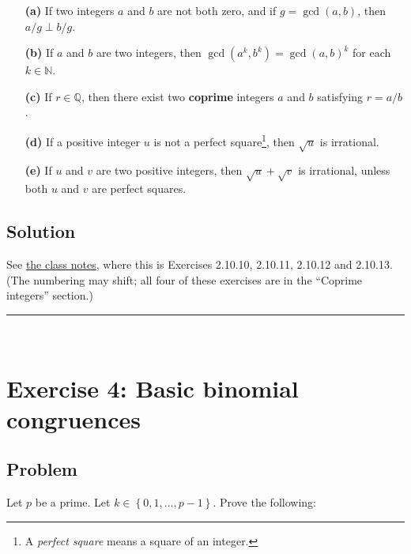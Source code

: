 \documentclass[paper=a4, fontsize=12pt]{scrartcl} %
\newcommand{\QQ}{\mathbb{Q}} %
\newcommand{\NN}{\mathbb{N}} %
\newcommand{\set}[1]{\left\{ #1 \right\}}
\newcommand{\tup}[1]{\left( #1 \right)}
\newcommand{\horrule}[1]{\rule{\linewidth}{#1}} %
\theoremstyle{plainsl}
\theoremstyle{definition}
\theoremstyle{remark}
\begin{document}
\begin{enumerate}

\item[\textbf{(a)}]
If two integers $a$ and $b$ are not both zero, and
if $g = \gcd\tup{a, b}$, then $a/g \perp b/g$.

\item[\textbf{(b)}]
If $a$ and $b$ are two integers, then
$\gcd\tup{a^k, b^k} = \gcd\tup{a, b}^k$ for each
$k \in \NN$.

\item[\textbf{(c)}]
If $r \in \QQ$, then there exist two \textbf{coprime}
integers $a$ and $b$ satisfying $r = a/b$.

\item[\textbf{(d)}]
If a positive integer $u$ is not a perfect
square\footnote{A \textit{perfect square} means a square
of an integer.},
then $\sqrt{u}$ is irrational.

\item[\textbf{(e)}]
If $u$ and $v$ are two positive integers,
then $\sqrt{u} + \sqrt{v}$ is irrational,
unless both $u$ and $v$ are perfect squares.

\end{enumerate}

\subsection{Solution}

See
\href{http://www-users.math.umn.edu/~dgrinber/19s/notes.pdf}{the class notes},
where this is Exercises 2.10.10, 2.10.11, 2.10.12 and 2.10.13.
(The numbering may shift; all four of these exercises are in the
``Coprime integers''
section.)

\horrule{0.3pt} \\[0.4cm]

\section{Exercise 4: Basic binomial congruences}

\subsection{Problem}

Let $p$ be a prime.
Let $k \in \set{0, 1, \ldots, p-1}$.
Prove the following:
\end{document}
